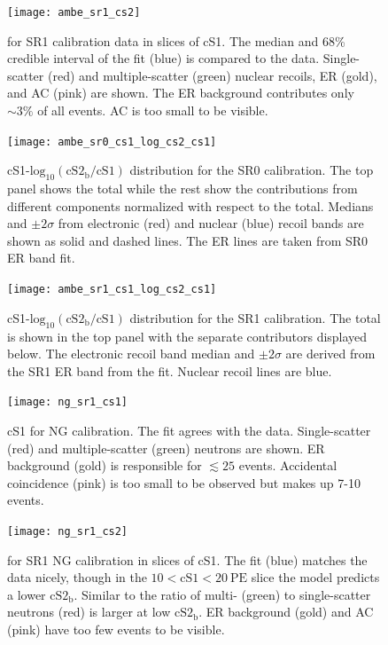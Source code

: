\begin{figure}
\centering
\texttt{[image: ambe\_sr1\_cs2]}
\caption{\cstwob for SR1 \ambe calibration data in slices of cS1.  The median and 68\% credible interval of the fit (blue) is compared
to the data.  Single-scatter (red) and multiple-scatter (green) nuclear recoils, ER (gold), and AC (pink) are shown.  The ER background
contributes only ${\sim}3\%$ of all events.  AC is too small to be visible.}
\label{fig:er_nr_calibrations_results_ambe_sr1_cs2}
\end{figure}

\begin{figure}
\centering
\texttt{[image: ambe\_sr0\_cs1\_log\_cs2\_cs1]}
\caption{cS1-$\mathrm{log}_{10}(\mathrm{cS2_b / cS1})$ distribution for the SR0 \ambe calibration.  The top panel shows the
total while the rest show the contributions from different components normalized with respect to the total.  Medians and $\pm 2\sigma$
from electronic (red) and nuclear (blue) recoil bands are shown as solid and dashed lines.  The ER lines are taken from SR0 ER band fit.}
\label{fig:er_nr_calibrations_results_ambe_sr0_cs1_log_cs2_cs1}
\end{figure}

\begin{figure}
\centering
\texttt{[image: ambe\_sr1\_cs1\_log\_cs2\_cs1]}
\caption{cS1-$\mathrm{log}_{10}(\mathrm{cS2_b / cS1})$ distribution for the SR1 \ambe calibration.  The total is shown
in the top panel with the separate contributors displayed below.  The electronic recoil band median and $\pm 2\sigma$ are derived
from the SR1 ER band from the fit.  Nuclear recoil lines are blue.}
\label{fig:er_nr_calibrations_results_ambe_sr1_cs1_log_cs2_cs1}
\end{figure}

\begin{figure}
\centering
\texttt{[image: ng\_sr1\_cs1]}
\caption{cS1 for NG calibration.  The fit agrees with the data.  Single-scatter (red) and multiple-scatter (green) neutrons are shown.  ER
background (gold) is responsible for $\lesssim 25$ events.  Accidental coincidence (pink) is too small to be observed but makes up
7-10 events.}
\label{fig:er_nr_calibrations_results_ng_sr1_cs1}
\end{figure}

\begin{figure}
\centering
\texttt{[image: ng\_sr1\_cs2]}
\caption{\cstwob for SR1 NG calibration in slices of cS1.  The fit (blue) matches the data nicely, though in the
$10 < \mathrm{cS1} < 20\ \mathrm{PE}$ slice the model predicts a lower $\mathrm{cS2_b}$.  Similar to \ambe the ratio of multi-
(green) to single-scatter neutrons (red) is larger at low $\mathrm{cS2_b}$.  ER background (gold) and AC (pink) have too few events
to be visible.}
\label{fig:er_nr_calibrations_results_ng_sr1_cs2}
\end{figure}


